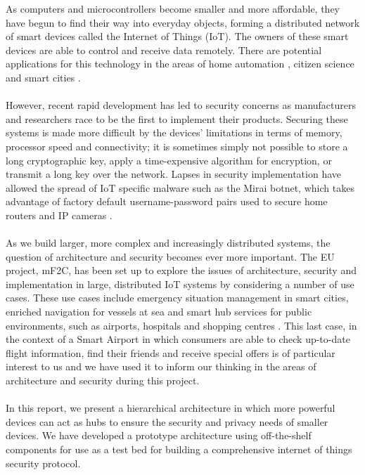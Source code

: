 As computers and microcontrollers become smaller and more affordable, they have begun to find their way into everyday objects, forming a distributed network of smart devices called the Internet of Things (IoT). The owners of these smart devices are able to control and receive data remotely. There are potential applications for this technology in the areas of home automation \cite{openhab}, citizen science \cite{radiation}\cite{flooddetection} and smart cities \cite{smartcities}.

\paragraph{}
However, recent rapid development has led to security concerns as manufacturers and researchers race to be the first to implement their products. Securing these systems is made more difficult by the devices’ limitations in terms of memory, processor speed and connectivity; it is sometimes simply not possible to store a long cryptographic key, apply a time-expensive algorithm for encryption, or transmit a long key over the network. Lapses in security implementation have allowed the spread of IoT specific malware such as the Mirai botnet, which takes advantage of factory default username-password pairs used to secure home routers and IP cameras \cite{mirai}.

\paragraph{}
As we build larger, more complex and increasingly distributed systems, the question of architecture and security becomes ever more important. The EU project, mF2C, has been set up to explore the issues of architecture, security and implementation in large, distributed IoT systems by considering a number of use cases. These use cases include emergency situation management in smart cities, enriched navigation for vessels at sea and smart hub services for public environments, such as airports, hospitals and shopping centres \cite{mf2cwebsite}. This last case, in the context of a Smart Airport in which consumers are able to check up-to-date flight information, find their friends and receive special offers is of particular interest to us and we have used it to inform our thinking in the areas of architecture and security during this project.

\paragraph{}
In this report, we present a hierarchical architecture in which more powerful devices can act as hubs to ensure the security and privacy needs of smaller devices.  We have developed a prototype architecture using off-the-shelf components for use as a test bed for building a comprehensive internet of things security protocol.
